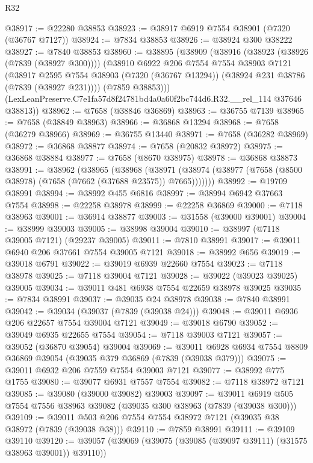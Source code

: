 \begin{lexlean}{R32}
\begin{coremodule}
@38917 := @22280 @38853
@38923 := @38917 @6919 @7554 @38901 (@7320 (@36767 @7127))
@38924 := @7834 @38853
@38926 := @38924 @300 @38222
@38927 := @7840 @38853
@38960 := @38895
    (@38909
      (@38916
        (@38923 (@38926 (@7839 (@38927 @300))))
        (@38910
          @6922
          @206
          @7554
          @7554
          @38903
          @7121
          (@38917
            @2595
            @7554
            @38903
            (@7320 (@36767 @13294))
            (@38924 @231 @38786 (@7839 (@38927 @231))))
          (@7859 @38853)))
      (LexLeanPreserve.C7e1fa57d8f24781bd4a0a60f2bc744d6.R32.__rel_114 @37646 @38813))
@38962 := @7658 (@38846 @36869)
@38963 := @36755 @7139
@38965 := @7658 (@38849 @38963)
@38966 := @36868 @13294
@38968 := @7658 (@36279 @38966)
@38969 := @36755 @13440
@38971 := @7658 (@36282 @38969)
@38972 := @36868 @38877
@38974 := @7658 (@20832 @38972)
@38975 := @36868 @38884
@38977 := @7658 (@8670 @38975)
@38978 := @36868 @38873
@38991 := @38962
    (@38965
      (@38968
        (@38971 (@38974 (@38977 (@7658 (@8500 @38978) (@7658 (@7662 (@37688 @23575)) @7665)))))))
@38992 := @19709 @38991
@38994 := @38992 @455 @6816
@38997 := @38994 @6942 @37663 @7554
@38998 := @22258 @38978
@38999 := @22258 @36869
@39000 := @7118 @38963
@39001 := @36914 @38877
@39003 := @31558 (@39000 @39001)
@39004 := @38999 @39003
@39005 := @38998 @39004
@39010 := @38997 (@7118 @39005 @7121) (@29237 @39005)
@39011 := @7810 @38991
@39017 := @39011 @6940 @206 @37661 @7554 @39005 @7121
@39018 := @38992 @656
@39019 := @39018 @6791
@39022 := @39019 @6939 @22660 @7554
@39023 := @7118 @38978
@39025 := @7118 @39004 @7121
@39028 := @39022 (@39023 @39025) @39005
@39034 := @39011 @481 @6938 @7554 @22659 @38978 @39025
@39035 := @7834 @38991
@39037 := @39035 @24 @38978
@39038 := @7840 @38991
@39042 := @39034 (@39037 (@7839 (@39038 @24)))
@39048 := @39011 @6936 @206 @22657 @7554 @39004 @7121
@39049 := @39018 @6790
@39052 := @39049 @6935 @22655 @7554
@39054 := @7118 @39003 @7121
@39057 := @39052 (@36870 @39054) @39004
@39069 := @39011 @6928 @6934 @7554 @8809 @36869 @39054 (@39035 @379 @36869 (@7839 (@39038 @379)))
@39075 := @39011 @6932 @206 @7559 @7554 @39003 @7121
@39077 := @38992 @775 @1755
@39080 := @39077 @6931 @7557 @7554
@39082 := @7118 @38972 @7121
@39085 := @39080 (@39000 @39082) @39003
@39097 := @39011 @6919 @505 @7554 @7556 @38963 @39082 (@39035 @300 @38963 (@7839 (@39038 @300)))
@39109 := @39011 @503 @206 @7554 @7554 @38972 @7121 (@39035 @38 @38972 (@7839 (@39038 @38)))
@39110 := @7859 @38991
@39111 := @39109 @39110
@39120 := @39057 (@39069 (@39075 (@39085 (@39097 @39111) (@31575 @38963 @39001)) @39110))

\end{coremodule}
\end{lexlean}
